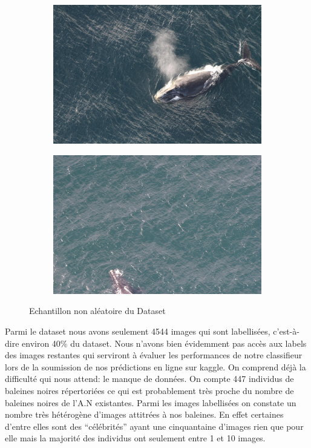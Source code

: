 \documentclass[12pt,a4paper]{report}
\begin{document}
\begin{spacing}{1.5}
\begin{figure}[H]
\medskip
\begin{subfigure}{0.55\textwidth}
\includegraphics[width=\linewidth]{figures/whalesImg/w5.jpg}
\end{subfigure}\hspace*{\fill}
\begin{subfigure}{0.55\textwidth}
\includegraphics[width=\linewidth]{figures/whalesImg/w6.jpg}
\end{subfigure}

\caption{Echantillon non aléatoire du Dataset} \label{fig:1}
\end{figure}

\newpage

Parmi le dataset nous avons seulement 4544 images qui sont labellisées, c'est-à-dire environ 40\% du dataset. Nous n’avons bien évidemment pas accès aux labels des images restantes qui serviront à évaluer les performances de notre classifieur lors de la soumission de nos prédictions en ligne sur kaggle. On comprend déjà la difficulté qui nous attend: le manque de données.
On compte 447 individus de baleines noires répertoriées ce qui est probablement très proche du nombre de baleines noires de l’A.N existantes. Parmi les images labellisées on constate un nombre très hétérogène d’images attitrées à nos baleines. En effet certaines d’entre elles sont des “célébrités” ayant une cinquantaine d’images rien que pour elle mais la majorité des individus ont seulement entre 1 et 10 images. 


\end{spacing}
\end{document}

